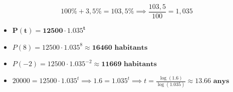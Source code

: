 \documentclass[a4paper,12pt]{article}
\begin{document}
\begin{equation}
    100\% + 3,5\% = 103,5\% \implies\frac{103,5}{100}=1,035
\end{equation}

\begin{itemize}
    \item[a)] $\mathbf{P(t) = 12500 \cdot 1.035^t}$
    \item[b)] $P(8) = 12500 \cdot 1.035^8 \approx \mathbf{16460 \text{ habitants}}$
    \item[c)] $P(-2) = 12500 \cdot 1.035^{-2} \approx \mathbf{11669 \text{ habitants}}$
    \item[d)] $20000 = 12500 \cdot 1.035^t \implies 1.6 = 1.035^t \implies t = \frac{\log(1.6)}{\log(1.035)} \approx \mathbf{13.66 \text{ anys}}$
\end{itemize}
\end{document}
